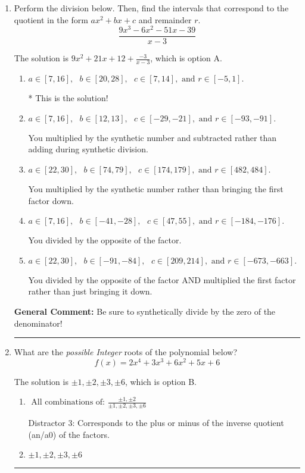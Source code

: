 \documentclass{extbook}[14pt]
\newcommand{\litem}[1]{\item #1

\rule{\textwidth}{0.4pt}}
\begin{document}
\begin{enumerate}\litem{
Perform the division below. Then, find the intervals that correspond to the quotient in the form $ax^2+bx+c$ and remainder $r$.
\[ \frac{9x^{3} -6 x^{2} -51 x -39}{x -3} \]

The solution is \( 9x^{2} +21 x + 12 + \frac{-3}{x -3} \), which is option A.\begin{enumerate}[label=\Alph*.]
\item \( a \in [7, 16], \text{   } b \in [20, 28], \text{   } c \in [7, 14], \text{   and   } r \in [-5, 1]. \)

* This is the solution!
\item \( a \in [7, 16], \text{   } b \in [12, 13], \text{   } c \in [-29, -21], \text{   and   } r \in [-93, -91]. \)

 You multiplied by the synthetic number and subtracted rather than adding during synthetic division.
\item \( a \in [22, 30], \text{   } b \in [74, 79], \text{   } c \in [174, 179], \text{   and   } r \in [482, 484]. \)

 You multiplied by the synthetic number rather than bringing the first factor down.
\item \( a \in [7, 16], \text{   } b \in [-41, -28], \text{   } c \in [47, 55], \text{   and   } r \in [-184, -176]. \)

 You divided by the opposite of the factor.
\item \( a \in [22, 30], \text{   } b \in [-91, -84], \text{   } c \in [209, 214], \text{   and   } r \in [-673, -663]. \)

 You divided by the opposite of the factor AND multiplied the first factor rather than just bringing it down.
\end{enumerate}

\textbf{General Comment:} Be sure to synthetically divide by the zero of the denominator!
}
\litem{
What are the \textit{possible Integer} roots of the polynomial below?
\[ f(x) = 2x^{4} +3 x^{3} +6 x^{2} +5 x + 6 \]

The solution is \( \pm 1,\pm 2,\pm 3,\pm 6 \), which is option B.\begin{enumerate}[label=\Alph*.]
\item \( \text{ All combinations of: }\frac{\pm 1,\pm 2}{\pm 1,\pm 2,\pm 3,\pm 6} \)

 Distractor 3: Corresponds to the plus or minus of the inverse quotient (an/a0) of the factors. 
\item \( \pm 1,\pm 2,\pm 3,\pm 6 \)


\end{enumerate}}
\end{enumerate}
\end{document}
